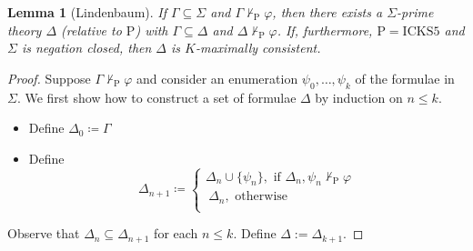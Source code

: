 \documentclass{myifcolog}
\newcommand{\K}{K}
\newcommand{\hickss}{\mathrm{ICKS5}}
\newcommand{\hickp}{\mathrm{P}}
\newtheorem{lemma}[theorem]{Lemma}
\numberwithin{theorem}{section}
\begin{document}
\begin{lemma}[Lindenbaum]\label{l: Lindenbaum for IM}
    If $\Gamma \subseteq \Sigma$ and $\Gamma \not \vdash_\mathrm{P} \varphi$, then there exists a $\Sigma$-prime theory $\Delta$ (relative to $\mathrm{P}$) with $\Gamma \subseteq \Delta$ and $\Delta \not \vdash_\mathrm{P} \varphi$. If, furthermore, $\hickp = \hickss$ and $\Sigma$ is negation closed, then $\Delta$ is $\K$-maximally consistent.
\end{lemma}
\begin{proof}
Suppose $\Gamma \not \vdash_\mathrm{P} \varphi$ and consider an enumeration $\psi_0, \ldots, \psi_k$ of the formulae in $\Sigma$. We first show how to construct a set of formulae $\Delta$ by induction on $n \leq k$.
\begin{itemize}
    \item Define $\Delta_0 \coloneqq \Gamma$
    \item Define
    \begin{equation*}
        \Delta_{n+1} \coloneqq \begin{cases}
                               \Delta_n \cup \{\psi_n\}, \text{ if } \Delta_n, \psi_n \not \vdash_\mathrm{P} \varphi \\\
                               \Delta_n, \text{ otherwise }\\
                        \end{cases}
    \end{equation*}
\end{itemize}
Observe that $\Delta_n \subseteq \Delta_{n+1}$ for each $n \leq k$. Define $\Delta := \Delta_{k+1}$. \smallskip


\end{proof}
\end{document}
